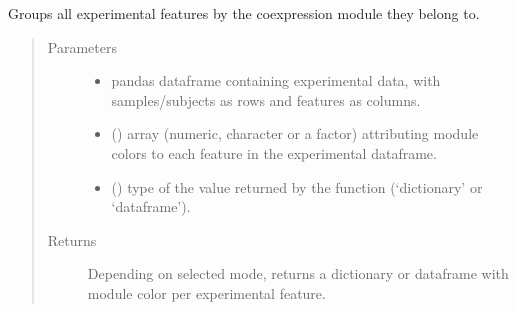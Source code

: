 \documentclass[letterpaper,10pt,english]{sphinxmanual}
\begin{document}
\begin{fulllineitems}
\label{\detokenize{_autosummary/analytics_core.analytics:analytics_core.analytics.wgcnaAnalysis.get_FeaturesPerModule}}
Groups all experimental features by the co\sphinxhyphen{}expression module they belong to.
\begin{quote}\begin{description}
\item[{Parameters}] \leavevmode\begin{itemize}
\item {} 
 \textendash{} pandas dataframe containing experimental data, with samples/subjects as rows and features as columns.

\item {} 
 () \textendash{} array (numeric, character or a factor) attributing module colors to each feature in the experimental dataframe.

\item {} 
 () \textendash{} type of the value returned by the function (‘dictionary’ or ‘dataframe’).

\end{itemize}

\item[{Returns}] \leavevmode
Depending on selected mode, returns a dictionary or dataframe with module color per experimental feature.

\end{description}\end{quote}

\end{fulllineitems}

\end{document}

